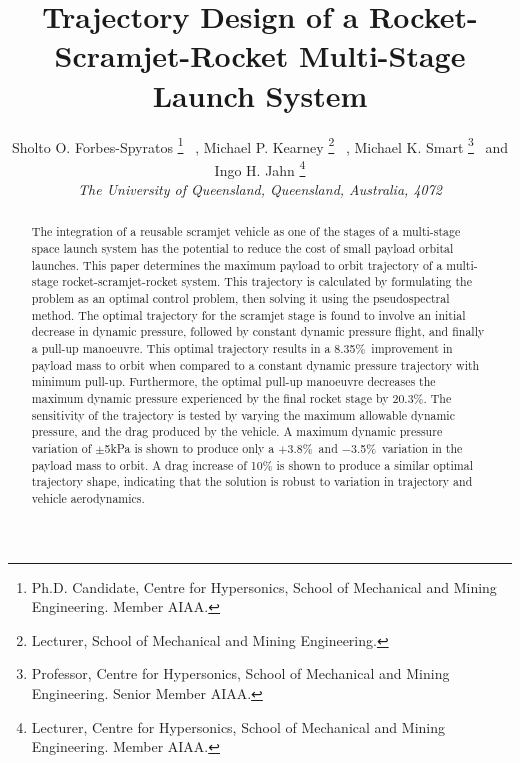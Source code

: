 \documentclass[]{aiaa-tc}
\newcommand{\PayloadImprovement}{8.35\%}
\newcommand{\qDecrease}{20.3\%}
\newcommand{\qVariationPlus}{$+$3.8\%}
\newcommand{\qVariationMinus}{$-$3.5\%}
\begin{document}

\title{Trajectory Design of a Rocket-Scramjet-Rocket Multi-Stage Launch System} %




 \author{
 	Sholto O. Forbes-Spyratos%
 	\thanks{Ph.D. Candidate, Centre for Hypersonics, School of Mechanical and Mining Engineering. Member AIAA.}
 	\ ,  Michael P. Kearney
 	\thanks{Lecturer, School of Mechanical and Mining Engineering.}
 	\ ,  Michael K. Smart
 	\thanks{Professor, Centre for Hypersonics, School of Mechanical and Mining Engineering. Senior Member AIAA.}
 	\ and   Ingo H. Jahn
 	\thanks{Lecturer, Centre for Hypersonics, School of Mechanical and Mining Engineering. Member AIAA.}
 	\\
 	{\normalsize\itshape
 		The University of Queensland, Queensland, Australia, 4072}\\
 }





\begin{abstract}

The integration of a reusable scramjet vehicle as one of the stages of a multi-stage space launch system has the potential to reduce the cost of small payload orbital launches. 
This paper determines the maximum payload to orbit trajectory of a multi-stage rocket-scramjet-rocket system. This trajectory is calculated by formulating the problem as an optimal control problem, then solving it using the pseudospectral method. 
The optimal trajectory for the scramjet stage is found to involve an initial decrease in dynamic pressure, followed by constant dynamic pressure flight, and finally a pull-up manoeuvre. This optimal trajectory results in a \PayloadImprovement\ improvement in payload mass to orbit when compared to a constant dynamic pressure trajectory with minimum pull-up. 
Furthermore, the optimal pull-up manoeuvre decreases the maximum dynamic pressure experienced by the final rocket stage by \qDecrease. 
The sensitivity of the trajectory is tested by varying the maximum allowable dynamic pressure, and the drag produced by the vehicle. 
A maximum dynamic pressure variation of $\pm$5kPa is shown to produce only a \qVariationPlus\ and \qVariationMinus\ variation in the payload mass to orbit. A drag increase of 10\% is shown to produce a similar optimal trajectory shape, indicating that the solution is robust to variation in trajectory and vehicle aerodynamics. 


\end{abstract}
\maketitle
\end{document}
